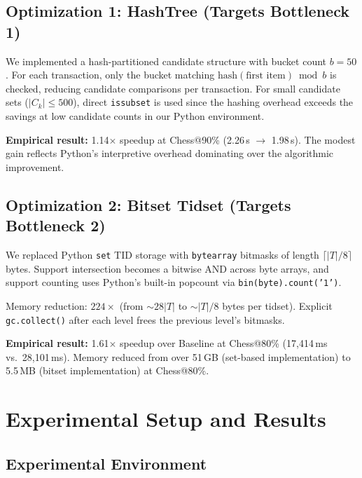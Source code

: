 \documentclass[conference]{IEEEtran}
\begin{document}
\subsection{Optimization 1: HashTree (Targets Bottleneck 1)}

We implemented a hash-partitioned candidate structure with bucket count
$b = 50$. For each transaction, only the bucket matching
$\text{hash}(\text{first item}) \bmod b$ is checked, reducing
candidate comparisons per transaction. For small candidate sets
($|C_k| \leq 500$), direct \texttt{issubset} is used since the hashing
overhead exceeds the savings at low candidate counts in our Python
environment.

\textbf{Empirical result:} 1.14$\times$ speedup at Chess@90\%
(2.26\,s $\to$ 1.98\,s). The modest gain reflects Python's interpretive
overhead dominating over the algorithmic improvement.

\subsection{Optimization 2: Bitset Tidset (Targets Bottleneck 2)}

We replaced Python \texttt{set} TID storage with \texttt{bytearray}
bitmasks of length $\lceil|T|/8\rceil$ bytes. Support intersection
becomes a bitwise AND across byte arrays, and support counting uses
Python's built-in popcount via \texttt{bin(byte).count('1')}.

Memory reduction: $224\times$ (from $\sim28|T|$ to $\sim|T|/8$ bytes
per tidset). Explicit \texttt{gc.collect()} after each level frees the
previous level's bitmasks.

\textbf{Empirical result:} 1.61$\times$ speedup over Baseline at
Chess@80\% (17,414\,ms vs.\ 28,101\,ms). Memory reduced from over 51\,GB
(set-based implementation) to 5.5\,MB (bitset implementation) at
Chess@80\%.

\section{Experimental Setup and Results}

\subsection{Experimental Environment}
\end{document}
